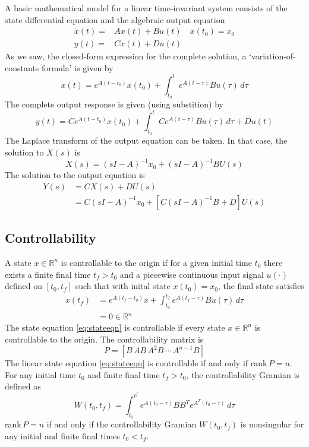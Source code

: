 \documentclass[11pt]{book}
\theoremstyle{example}
\begin{document}
A basic mathematical model for a linear time-invariant system consists of the state differential equation and the algebraic output equation
\begin{align}
	\dot{x}(t)=&Ax(t)+Bu(t)\quad{x(t_0)=x_0}\label{eq:stateeqn}\\
	y(t)=&Cx(t)+Du(t)
\end{align}
As we saw, the closed-form expression for the complete solution, a `variation-of-constants formula' is given by
\begin{equation}
	x(t)=e^{A(t-t_0)}x(t_0)+\int_{t_0}^t{e^{A(t-\tau)}Bu(\tau)\,d\tau}
\end{equation}
The complete output response is given (using substition) by
\begin{equation}
	y(t)=Ce^{A(t-t_0)}x(t_0)+\int_{t_0}^t{Ce^{A(t-\tau)}Bu(\tau)\,d\tau}+Du(t)
\end{equation}
The Laplace transform of the output equation can be taken. In that case, the solution to $X(s)$ is
\begin{equation}
	X(s)=(sI-A)^{-1}x_0+(sI-A)^{-1}BU(s)
\end{equation}
The solution to the output equation is
\begin{align}
	Y(s)&=CX(s)+DU(s)\\
	&=C(sI-A)^{-1}x_0+[C(sI-A)^{-1}B+D]U(s)
\end{align}

\subsection{Controllability}

A state $x\in\mathbb{R}^n$ is controllable to the origin if for a given initial time $t_0$ there exists a finite final time $t_f>t_0$ and a piecewise continuous input signal $u(\cdot)$ defined on $[t_0,t_f]$ such that with inital state $x(t_0)=x_0$, the final state satisfies
\begin{align}
	x(t_f)&=e^{A(t_f-t_0)}x+\int_{t_0}^{t_f}{e^{A(t_f-\tau)}Bu(\tau)\,d\tau}\\
	&=0\in\mathbb{R}^n
\end{align}
The state equation \ref{eq:stateeqn} is controllable if every state $x\in\mathbb{R}^n$ is controllable to the origin.
The controllability matrix is
\begin{equation}
	P=[B\,AB\,A^2B\,\cdots\,A^{n-1}B]
\end{equation}
The linear state equation \ref{eq:stateeqn} is controllable if and only if $\mathrm{rank}\,P=n$.
For any initial time $t_0$ and finite final time $t_f>t_0$, the controllability Gramian is defined as
\begin{equation}
	W(t_0,t_f)=\int_{t_0}^{t^f}{e^{A(t_0-\tau)}BB^Te^{A^T(t_0-\tau)}\,d\tau}
\end{equation}
$\mathrm{rank}\,P=n$ if and only if the controllability Gramian $W(t_0,t_f)$ is nonsingular for any initial and finite final times $t_0<t_f$.
\end{document}
